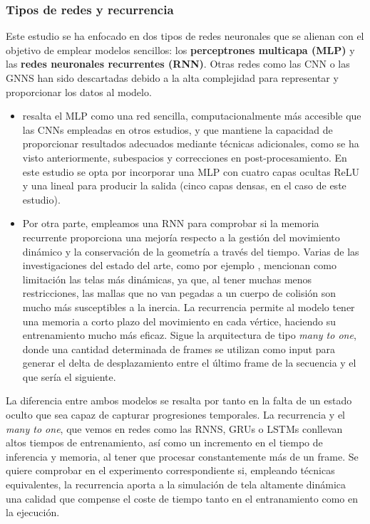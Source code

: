 \subsubsection{Tipos de redes y recurrencia}
Este estudio se ha enfocado en dos tipos de redes neuronales que se alienan con el objetivo de emplear modelos sencillos: los \textbf{perceptrones multicapa (MLP)} y las \textbf{redes neuronales recurrentes (RNN)}. Otras redes como las CNN o las GNNS han sido descartadas debido a la alta complejidad para representar y proporcionar los datos al modelo. 

\begin{itemize}
    \item \cite{holden_subspace_2019} resalta el MLP como una red sencilla, computacionalmente más accesible que las CNNs empleadas en otros estudios, y que mantiene la capacidad de proporcionar resultados adecuados mediante técnicas adicionales, como se ha visto anteriormente, subespacios y correcciones en post-procesamiento. En este estudio se opta por incorporar una MLP con cuatro capas ocultas ReLU y una lineal para producir la salida (cinco capas densas, en el caso de este estudio). 
    
    \item Por otra parte, empleamos una RNN para comprobar si la memoria recurrente proporciona una mejoría respecto a la gestión del movimiento dinámico y la conservación de la geometría a través del tiempo. Varias de las investigaciones del estado del arte, como por ejemplo \cite{santesteban2022snug}, mencionan como limitación las telas más dinámicas, ya que, al tener muchas menos restricciones, las mallas que no van pegadas a un cuerpo de colisión son mucho más susceptibles a la inercia. La recurrencia permite al modelo tener una memoria a corto plazo del movimiento en cada vértice, haciendo su entrenamiento mucho más eficaz. Sigue la arquitectura de tipo \textit{many to one}, donde una cantidad determinada de frames se utilizan como input para generar el delta de desplazamiento entre el último frame de la secuencia y el que sería el siguiente.
\end{itemize}

La diferencia entre ambos modelos se resalta por tanto en la falta de un estado oculto que sea capaz de capturar progresiones temporales. La recurrencia y el \textit{many to one}, que vemos en redes como las RNNS, GRUs o LSTMs conllevan altos tiempos de entrenamiento, así como un incremento en el tiempo de inferencia y memoria, al tener que procesar constantemente más de un frame. Se quiere comprobar en el experimento correspondiente si, empleando técnicas equivalentes, la recurrencia aporta a la simulación de tela altamente dinámica una calidad que compense el coste de tiempo tanto en el entranamiento como en la ejecución. \newline

